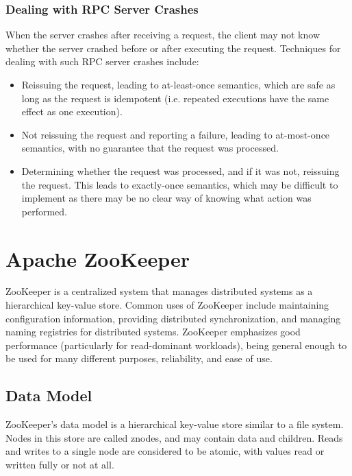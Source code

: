 \documentclass[12pt,titlepage]{article}
\begin{document}
      \subsubsection{Dealing with RPC Server Crashes}
        When the server crashes after receiving a request, the client may not know whether the server crashed
        before or after executing the request. Techniques for dealing with such RPC server crashes include:
        \begin{itemize}
          \item Reissuing the request, leading to at-least-once semantics, which are safe as long as the request is idempotent
            (i.e. repeated executions have the same effect as one execution).
          \item Not reissuing the request and reporting a failure, leading to at-most-once semantics, with no guarantee that the
            request was processed.
          \item Determining whether the request was processed, and if it was not, reissuing the request. This leads to exactly-once
            semantics, which may be difficult to implement as there may be no clear way of knowing what action was performed.
        \end{itemize}

  \newpage

  \section{Apache ZooKeeper}
    ZooKeeper is a centralized system that manages distributed systems as a hierarchical key-value store. Common uses of ZooKeeper
    include maintaining configuration information, providing distributed synchronization, and managing naming registries for distributed
    systems. ZooKeeper emphasizes good performance (particularly for read-dominant workloads), being general enough to be used for many
    different purposes, reliability, and ease of use.

    \subsection{Data Model}
      ZooKeeper's data model is a hierarchical key-value store similar to a file system. Nodes in this store are called znodes, and may
      contain data and children. Reads and writes to a single node are considered to be atomic, with values read or written fully or not
      at all.
\end{document}
